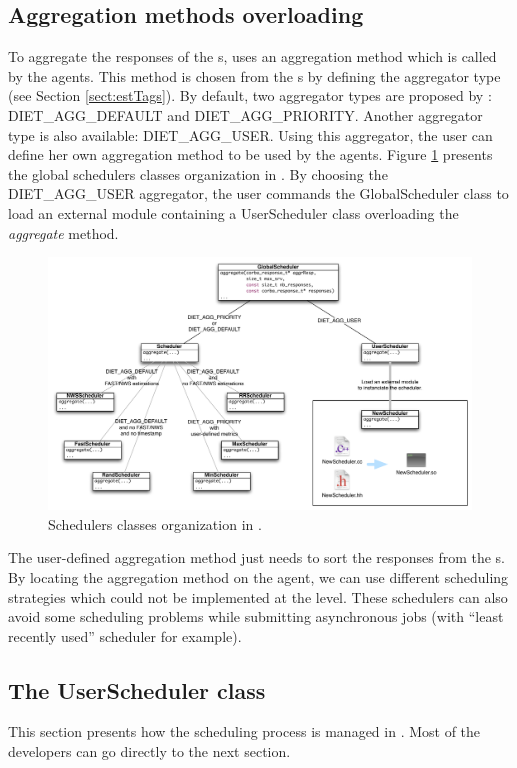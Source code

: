 \subsection{Aggregation methods overloading}
To aggregate the responses of the {\sed}s, \diet uses an aggregation method
which is called by the agents. This method is chosen from the {\sed}s
by defining the aggregator type (see Section \ref{sect:estTags}).
By default, two aggregator types are proposed by \diet:
DIET\_AGG\_DEFAULT and DIET\_AGG\_PRIORITY. Another aggregator type is
also available: DIET\_AGG\_USER. Using this
aggregator, the user can define her own aggregation method to be used by
the agents. 
Figure \ref{fig:DIETScheduling} presents the global schedulers classes
organization in \diet. By choosing the DIET\_AGG\_USER aggregator, the user
commands the GlobalScheduler class to load an external module containing
a UserScheduler class overloading the \textit{aggregate} method.
\begin{figure}[h]
  \centering
  \includegraphics[width=16cm]{fig/DIETScheduling}
  \caption{Schedulers classes organization in \diet.\label{fig:DIETScheduling}}
\end{figure}

The user-defined aggregation method just needs to sort the responses from the
{\sed}s. By locating the aggregation method on the agent, we can use different
scheduling strategies which could not be implemented at the {\sed} level. These
schedulers can also avoid some scheduling problems while submitting asynchronous
jobs (with ``least recently used'' scheduler for example).

\subsection{The UserScheduler class}
This section presents how the scheduling process is managed in \diet.
Most of the developers can go directly to the next section.

